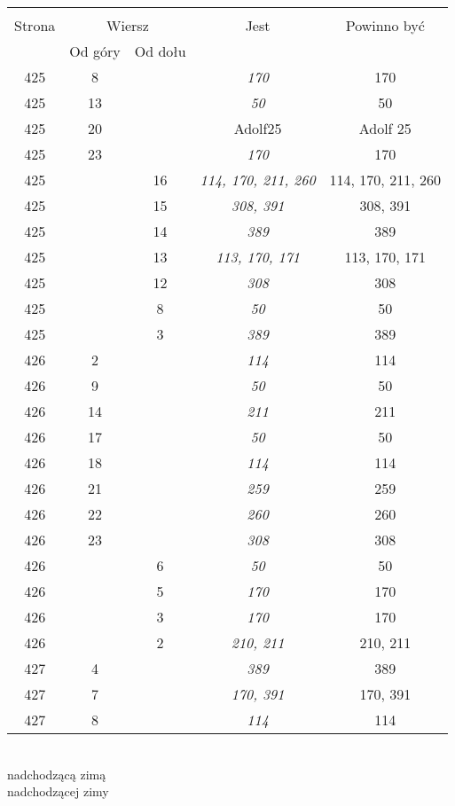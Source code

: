 \documentclass[a4paper,11pt]{article}
\begin{document}
\begin{center}
  \begin{tabular}{|c|c|c|c|c|}
    \hline
    & \multicolumn{2}{c|}{} & & \\
    Strona & \multicolumn{2}{c|}{Wiersz} & Jest
                              & Powinno być \\ \cline{2-3}
    & Od góry & Od dołu & & \\
    \hline
    425 &  8 & & \emph{170} & 170 \\
    425 & 13 & & \emph{50}  & 50 \\
    425 & 20 & & Adolf25 & Adolf 25 \\
    425 & 23 & & \emph{170} & 170 \\
    425 & & 16 & \emph{114, 170, 211, 260} & 114, 170, 211, 260 \\
    425 & & 15 & \emph{308, 391} & 308, 391 \\
    425 & & 14 & \emph{389} & 389 \\
    425 & & 13 & \emph{113, 170, 171} & 113, 170, 171 \\
    425 & & 12 & \emph{308} & 308 \\
    425 & &  8 & \emph{50}  &  50 \\
    425 & &  3 & \emph{389} & 389 \\
    426 &  2 & & \emph{114} & 114 \\
    426 &  9 & & \emph{50}  &  50 \\
    426 & 14 & & \emph{211} & 211 \\
    426 & 17 & & \emph{50}  &  50 \\
    426 & 18 & & \emph{114} & 114 \\
    426 & 21 & & \emph{259} & 259 \\
    426 & 22 & & \emph{260} & 260 \\
    426 & 23 & & \emph{308} & 308 \\
    426 & &  6 & \emph{50}  &  50 \\
    426 & &  5 & \emph{170} & 170 \\
    426 & &  3 & \emph{170} & 170 \\
    426 & &  2 & \emph{210, 211} & 210, 211 \\
    427 &  4 & & \emph{389} & 389 \\
    427 &  7 & & \emph{170, 391} & 170, 391 \\
    427 &  8 & & \emph{114} & 114 \\
    \hline
  \end{tabular}
\end{center}
\noi
{} \\
\Jest nadchodzącą zimą \\
\Pow  nadchodzącej zimy \\
\end{document}
